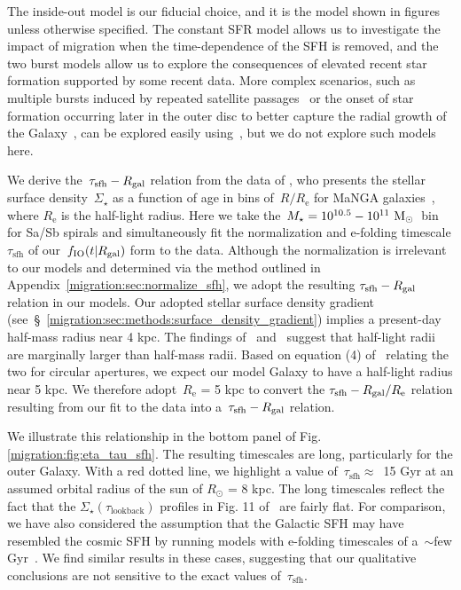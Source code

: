 The inside-out model is our fiducial choice, and it is the model shown in 
figures unless otherwise specified. 
The constant SFR model allows us to investigate the impact of migration when 
the time-dependence of the SFH is removed, and the two burst models allow us to 
explore the consequences of elevated recent star formation supported by some 
recent data. 
More complex scenarios, such as multiple bursts induced by repeated satellite 
passages~\citep[e.g.][]{Lian2020a, Lian2020b, RuizLara2020, Sysoliatina2021} or 
the onset of star formation occurring later in the outer disc to better capture 
the radial growth of the Galaxy~\citep[e.g.][]{Frankel2019}, can be 
explored easily using~\vice, but we do not explore such models here. 
\par 
We derive the~$\tau_\text{sfh}-R_\text{gal}$ relation from the data of 
\citet{Sanchez2020}, who presents the stellar surface density~$\Sigma_\star$ as 
a function of age in bins of~$R/R_\text{e}$ for MaNGA 
galaxies~\citep{Bundy2015}, where $R_\text{e}$ is the half-light radius. 
Here we take the~$M_\star = 10^{10.5} - 10^{11}~\text{M}_\odot$~bin for Sa/Sb spirals 
and simultaneously fit the normalization and e-folding timescale 
$\tau_\text{sfh}$ of our~$f_\text{IO}(t|R_\text{gal})$ form to the data. 
Although the normalization is irrelevant to our models and determined via the 
method outlined in Appendix~\ref{migration:sec:normalize_sfh}, we adopt the resulting 
$\tau_\text{sfh}-R_\text{gal}$ relation in our models. 
Our adopted stellar surface density gradient 
(see~\S~\ref{migration:sec:methods:surface_density_gradient}) implies a present-day 
half-mass radius near 4 kpc. 
The findings of~\citet{Garcia-Benito2017} and~\citet{GonzalezDelgado2014} 
suggest that half-light radii are marginally larger than half-mass radii. 
Based on equation (4) of~\citet{GonzalezDelgado2014} relating the two for 
circular apertures, we expect our model Galaxy to have a 
half-light radius near 5 kpc. 
We therefore adopt~$R_\text{e}$ = 5 kpc to convert the 
$\tau_\text{sfh}-R_\text{gal}/R_\text{e}$ relation resulting from our fit to the 
\citet{Sanchez2020} data into a~$\tau_\text{sfh}-R_\text{gal}$ relation. 
\par 
We illustrate this relationship in the bottom panel of Fig. 
\ref{migration:fig:eta_tau_sfh}. 
The resulting timescales are long, particularly for the outer Galaxy. 
With a red dotted line, we highlight a value of~$\tau_\text{sfh} \approx$~15 
Gyr at an assumed orbital radius of the sun of $R_\odot$ = 8 kpc. 
The long timescales reflect the fact that the 
$\Sigma_\star(\tau_\text{lookback})$ profiles in Fig. 11 of~\citet{Sanchez2020} 
are fairly flat. 
For comparison, we have also considered the assumption that the Galactic SFH 
may have resembled the cosmic SFH by running models with e-folding timescales 
of a~$\sim$few Gyr~\citep[e.g.][]{Madau2014}. 
We find similar results in these cases, suggesting that our qualitative 
conclusions are not sensitive to the exact values of~$\tau_\text{sfh}$. 

